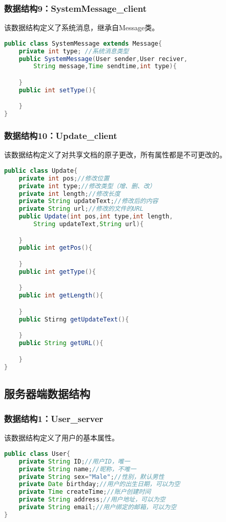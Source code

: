 \subsubsection{数据结构9：SystemMessage\_client}
该数据结构定义了系统消息，继承自Message类。
\begin{lstlisting}[language=Java, caption=SystemMessage定义]
public class SystemMessage extends Message{
    private int type; //系统消息类型
    public SystemMessage(User sender,User reciver,
        String message,Time sendtime,int type){

    } 
    public int setType(){

    }
}
\end{lstlisting}

\subsubsection{数据结构10：Update\_client}
该数据结构定义了对共享文档的原子更改，所有属性都是不可更改的。
\begin{lstlisting}[language=Java, caption=Update定义]
public class Update{
    private int pos;//修改位置
    private int type;//修改类型（增、删、改）
    private int length;//修改长度
    private String updateText;//修改后的内容
    private String url;//修改的文件的URL
    public Update(int pos,int type,int length,
        String updateText,String url){

    }
    public int getPos(){

    }
    public int getType(){

    }
    public int getLength(){

    }
    public Stirng getUpdateText(){

    }
    public String getURL(){

    }
}
\end{lstlisting}



\subsection{服务器端数据结构}
\subsubsection{数据结构1：User\_server}
该数据结构定义了用户的基本属性。
\begin{lstlisting}[language=Java, caption=User定义]
public class User{
    private String ID;//用户ID，唯一
    private String name;//昵称，不唯一
    private String sex="Male";//性别，默认男性
    private Date birthday;//用户的出生日期，可以为空
    private Time createTime;//账户创建时间
    private String address;//用户地址，可以为空
    private String email;//用户绑定的邮箱，可以为空
}
\end{lstlisting}

